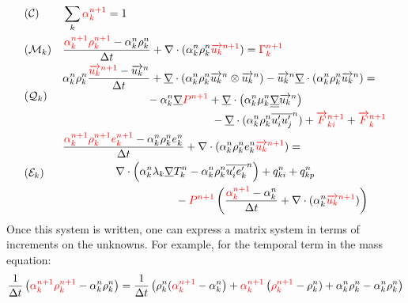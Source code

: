 \begin{align}
& (\mathcal{C}) && \sum_k  {\color{red} \alpha_k^{n+1}}=1 \label{eq:discAlphak}\\
& (\mathcal{M}_k) && \frac{ {\color{red} \alpha_k^{n+1} \rho_k^{n+1}}-\alpha_k^{n} \rho_k^{n}}{\Delta t} +\nabla \cdot ({\alpha_k^{n} \rho_k^{n}} {\color{red}  \vec{u_k}^{n+1}}) = {\color{red} \Gamma_k^{n+1}}\label{eq:discMk}\\
&(\mathcal{Q}_k) &&
  \begin{multlined}[c][0.8\linewidth]
    \alpha_k^{n} \rho_k^{n}\frac{{\color{red}\vec{u_k}^{n+1}}-\vec{u_k}^{n}}{\Delta t} + \underline{\nabla} \cdot \parent{{\alpha_k^{n} \rho_k^{n} \vec{u_k}^{n}} \otimes \vec{u_k}^{n}}-\vec{u_k}^{n}\underline{\nabla} \cdot \parent{\alpha_k^{n} \rho_k^{n} \vec{u_k}^{n}} = \\-\alpha_k^{n} \underline{\nabla} {\color{red}P^{n+1}} + \underline{\nabla} \cdot \parent{\alpha_k^{n} \mu_k^{n} \underline{\underline{\nabla}} \vec{u_k}^{n}} \\- \underline{\nabla} \cdot  (\alpha_k^{n}\rho_k^{n} \overline{u_i'u_j'}^{n}) + {\color{red}\vec{F}_{ki}^{n+1}} + {\color{red}\vec{F}_k^{n+1}}
  \end{multlined}\label{eq:discQk}\\
&(\mathcal{E}_k) &&
  \begin{multlined}[c][0.8\linewidth]
    \frac{ {\color{red}\alpha_k^{n+1} \rho_k^{n+1} e_k^{n+1}}-\alpha_k^{n} \rho_k^{n} e_k^{n}}{\Delta t} + \nabla \cdot ({\alpha_k^{n} \rho_k^{n} e_k^{n}} {\color{red}\vec{u_k}^{n+1}}) = \\\nabla \cdot \parent{ \alpha_k^{n}\lambda_k \underline{\nabla} T_k ^{n}  - \alpha_k^{n}\rho_k^{n} \overline{u_i'e_k'}^{n}} + q_{ki}^{n} + q_{kp}^{n} \\- {\color{red}P^{n+1}} \parent{\frac{{\color{red}\alpha_k^{n+1}}-\alpha_k^n}{\Delta t} + \nabla \cdot (\alpha_k^{n} {\color{red}\vec{u_k}^{n+1}})}
  \end{multlined}\label{eq:discEk}
\end{align}
Once this system is written, one can express a matrix system in terms of increments on the unknowns. For example, for the temporal term in the mass equation:
\begin{equation}
    \frac{1}{\Delta t}\left( {\color{red} \alpha_k^{n+1} \rho_k^{n+1}}-\alpha_k^{n} \rho_k^{n} \right) = \frac{1}{\Delta t}\left( {\rho_k^{n}}({\color{red} \alpha_k^{n+1}}-\alpha_k^{n} \right)+{\color{red} \alpha_k^{n+1}}\left( {\color{red} \rho_k^{n+1}}-\rho_k^{n})+\alpha_k^{n} \rho_k^{n}-\alpha_k^{n} \rho_k^{n} \right)
\end{equation}
